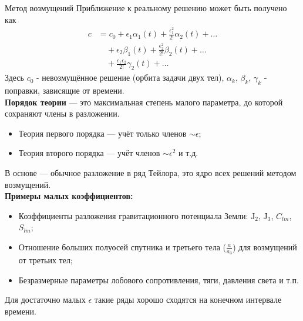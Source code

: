 \documentclass[8pt]{beamer}
\begin{document}
\begin{frame}{Метод возмущений}
Приближение к реальному решению может быть получено как 
\begin{equation*}
\begin{aligned}
    c &= c_0 + \epsilon_1 \alpha_1(t) + \frac{\epsilon_1^{2}}{2!} \alpha_2(t) + \dots \\
      &\quad + \epsilon_2 \beta_1(t) + \frac{\epsilon_2^{2}}{2!} \beta_2(t) + \dots \\
      &\quad + \frac{\epsilon_1 \epsilon_2}{2!} \gamma_2(t) + \dots
\end{aligned}
\end{equation*}
Здесь $c_0$ - невозмущённое решение (орбита задачи двух тел), $\alpha_k$, $\beta_k$, $\gamma_k$ - поправки, зависящие от времени. \\
\smallskip
\textbf{Порядок теории} — это максимальная степень малого параметра, до которой сохраняют члены в разложении.
\begin{itemize}
    \item Теория первого порядка — учёт только членов $\sim \epsilon$;
    \item Теория второго порядка — учёт членов $\sim \epsilon^2$ и т.д.
\end{itemize}
В основе — обычное разложение в ряд Тейлора, это ядро всех решений методом возмущений. \\
\smallskip
\textbf{Примеры малых коэффициентов:}
\begin{itemize}
    \item Коэффициенты разложения гравитационного потенциала Земли: $\text{J}_2$, $\text{J}_3$, $C_{lm}$, $S_{lm}$;
    \item Отношение больших полуосей спутника и третьего тела ($\frac{a}{a_3}$) для возмущений от третьих тел;
    \item Безразмерные параметры лобового сопротивления, тяги, давления света и т.п.
\end{itemize}
Для достаточно малых $\epsilon$ такие ряды хорошо сходятся на конечном интервале времени.
\end{frame}
\end{document}
